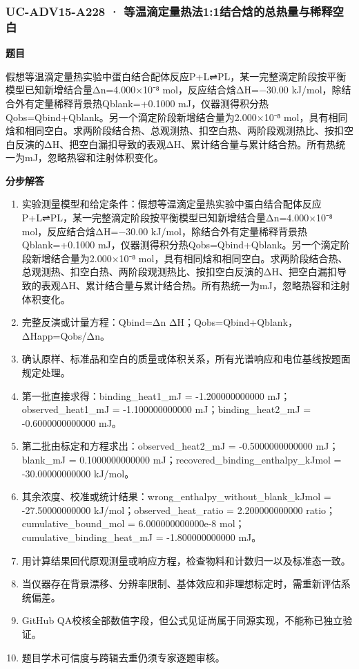 \documentclass[UTF8,11pt,a4paper]{ctexart}
\begin{document}
\subsubsection*{UC-ADV15-A228 · 等温滴定量热法1:1结合焓的总热量与稀释空白}
\noindent\textbf{题目}\par
假想等温滴定量热实验中蛋白结合配体反应P+L⇌PL，某一完整滴定阶段按平衡模型已知新增结合量Δn=4.000×10⁻⁸ mol，反应结合焓ΔH=−30.00 kJ/mol，除结合外有定量稀释背景热Qblank=+0.1000 mJ，仪器测得积分热Qobs=Qbind+Qblank。另一个滴定阶段新增结合量为2.000×10⁻⁸ mol，具有相同焓和相同空白。求两阶段结合热、总观测热、扣空白热、两阶段观测热比、按扣空白反演的ΔH、把空白漏扣导致的表观ΔH、累计结合量与累计结合热。所有热统一为mJ，忽略热容和注射体积变化。\par
\medskip\noindent\textbf{分步解答}
\begin{enumerate}
\item 实验测量模型和给定条件：假想等温滴定量热实验中蛋白结合配体反应P+L⇌PL，某一完整滴定阶段按平衡模型已知新增结合量Δn=4.000×10⁻⁸ mol，反应结合焓ΔH=−30.00 kJ/mol，除结合外有定量稀释背景热Qblank=+0.1000 mJ，仪器测得积分热Qobs=Qbind+Qblank。另一个滴定阶段新增结合量为2.000×10⁻⁸ mol，具有相同焓和相同空白。求两阶段结合热、总观测热、扣空白热、两阶段观测热比、按扣空白反演的ΔH、把空白漏扣导致的表观ΔH、累计结合量与累计结合热。所有热统一为mJ，忽略热容和注射体积变化。
\item 完整反演或计量方程：Qbind=Δn ΔH；Qobs=Qbind+Qblank，ΔHapp=Qobs/Δn。
\item 确认原样、标准品和空白的质量或体积关系，所有光谱响应和电位基线按题面规定处理。
\item 第一批直接求得：binding\_heat1\_mJ = -1.200000000000 mJ；observed\_heat1\_mJ = -1.100000000000 mJ；binding\_heat2\_mJ = -0.6000000000000 mJ。
\item 第二批由标定和方程求出：observed\_heat2\_mJ = -0.5000000000000 mJ；blank\_mJ = 0.1000000000000 mJ；recovered\_binding\_enthalpy\_kJmol = -30.00000000000 kJ/mol。
\item 其余浓度、校准或统计结果：wrong\_enthalpy\_without\_blank\_kJmol = -27.50000000000 kJ/mol；observed\_heat\_ratio = 2.200000000000 ratio；cumulative\_bound\_mol = 6.000000000000e-8 mol；cumulative\_binding\_heat\_mJ = -1.800000000000 mJ。
\item 用计算结果回代原观测量或响应方程，检查物料和计数归一以及标准态一致。
\item 当仪器存在背景漂移、分辨率限制、基体效应和非理想标定时，需重新评估系统偏差。
\item GitHub QA校核全部数值字段，但公式见证尚属于同源实现，不能称已独立验证。
\item 题目学术可信度与跨辑去重仍须专家逐题审核。
\end{enumerate}
\end{document}
